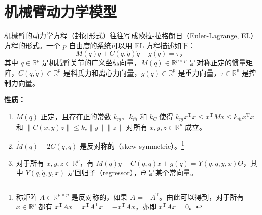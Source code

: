 \section{机械臂动力学模型}\label{6Aref}

机械臂的动力学方程（封闭形式）往往写成欧拉-拉格朗日（Euler-Lagrange, EL）方程的形式。一个 $p$ 自由度的系统可以用 EL 方程描述如下：
\begin{equation} \label{robotic_model}
    M(q) \ddot{q} + C(q, \dot{q}) \dot{q} + g(q) = \tau \text{，}
\end{equation}
其中 $q \in \mathbb{R}^p$ 是机械臂关节的广义坐标向量，$M(q) \in \mathbb{R}^{p \times p}$ 是对称正定的惯量矩阵，$C(q, \dot{q}) \in \mathbb{R}^p$ 是科氏力和离心力向量，$g(q)\in \mathbb{R}^p$ 是重力向量，$\tau \in \mathbb{R}^p$ 是控制力向量。

\noindent\textbf{性质：}
\begin{enumerate}
    \item $M(q)$ 正定，且存在正的常数 $k_{\underline{m}}$、$k_{\overline{m}}$ 和 $k_C$ 使得 $k_{\underline{m}} x^\mathrm{T} x \leq x^\mathrm{T} M x \leq k_{\overline{m}} x^\mathrm{T} x$ 和 $\| C (x, y) z \| \leq k_c \| y \| \| z \|$ 对所有 $x, y , z \in \mathbb{R}^p$ 成立。
    \item $\dot{M} (q) - 2 C (q, \dot{q})$ 是反对称的（skew symmetric）。\footnote{称矩阵 $A \in \mathbb{R}^{p \times p}$ 是反对称的，如果 $A = - A^\mathrm{T}$。由此可以得到，对于所有 $x \in \mathbb{R}^p$ 都有 $x^\mathrm{T} A x = x^\mathrm{T} A^\mathrm{T} x = - x^\mathrm{T} A x$，亦即 $x^\mathrm{T} A x = 0$。}
    \item 对于所有 $x, y , z \in \mathbb{R}^p$，有 $M (q) y + C (q, \dot{q}) x + g (q) = Y (q, \dot{q}, y, x) \Theta$，其中 $Y (q, \dot{q}, y, x)$ 是回归子（regressor），$\Theta$ 是某个常向量。
\end{enumerate}
